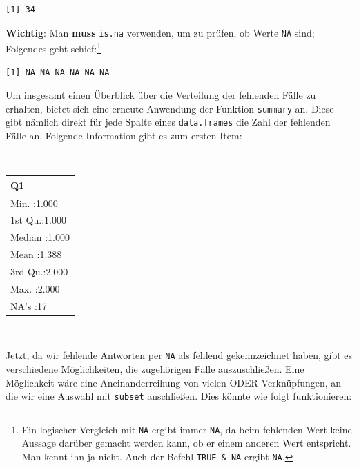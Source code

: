 \documentclass[12pt,]{tufte-book}
\newenvironment{Shaded}{\begin{snugshade}}{\end{snugshade}}
\newcommand{\KeywordTok}[1]{\textcolor[rgb]{0.13,0.29,0.53}{\textbf{#1}}}
\newcommand{\StringTok}[1]{\textcolor[rgb]{0.31,0.60,0.02}{#1}}
\newcommand{\OtherTok}[1]{\textcolor[rgb]{0.56,0.35,0.01}{#1}}
\newcommand{\OperatorTok}[1]{\textcolor[rgb]{0.81,0.36,0.00}{\textbf{#1}}}
\newcommand{\NormalTok}[1]{#1}
\theoremstyle{definition}
\theoremstyle{definition}
\theoremstyle{definition}
\theoremstyle{remark}
\begin{document}
\begin{verbatim}
[1] 34
\end{verbatim}

\textbf{Wichtig}: Man \textbf{muss} \texttt{is.na} verwenden, um zu
prüfen, ob Werte \texttt{NA} sind; Folgendes geht schief:\footnote{Ein
  logischer Vergleich mit \texttt{NA} ergibt immer \texttt{NA}, da beim
  fehlenden Wert keine Aussage darüber gemacht werden kann, ob er einem
  anderen Wert entspricht. Man kennt ihn ja nicht. Auch der Befehl
  \texttt{TRUE\ \&\ NA} ergibt \texttt{NA}.}

\begin{Shaded}
\end{Shaded}

\begin{verbatim}
[1] NA NA NA NA NA NA
\end{verbatim}

Um insgesamt einen Überblick über die Verteilung der fehlenden Fälle zu
erhalten, bietet sich eine erneute Anwendung der Funktion
\texttt{summary} an. Diese gibt nämlich direkt für jede Spalte eines
\texttt{data.frames} die Zahl der fehlenden Fälle an. Folgende
Information gibt es zum ersten Item:

~

\begin{tabular}{l}
\hline
Q1\\
\hline
Min.   :1.000\\
\hline
1st Qu.:1.000\\
\hline
Median :1.000\\
\hline
Mean   :1.388\\
\hline
3rd Qu.:2.000\\
\hline
Max.   :2.000\\
\hline
NA's   :17\\
\hline
\end{tabular}

~

Jetzt, da wir fehlende Antworten per \texttt{NA} als fehlend
gekennzeichnet haben, gibt es verschiedene Möglichkeiten, die
zugehörigen Fälle auszuschließen. Eine Möglichkeit wäre eine
Aneinanderreihung von vielen ODER-Verknüpfungen, an die wir eine Auswahl
mit \texttt{subset} anschließen. Dies könnte wie folgt funktionieren:
\end{document}
